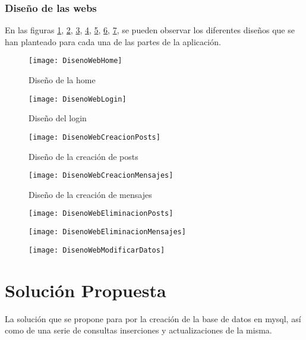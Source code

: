 \documentclass[a4paper]{article}
\begin{document}
	\subsubsection{Diseño de las webs}
	En las figuras \ref{home}, \ref{login}, \ref{post}, \ref{mensaje}, \ref{borrarPost}, \ref{borrarMensaje}, \ref{modificarDatos}, se pueden observar los diferentes diseños que se han planteado para cada una de las partes de la aplicación.
	\begin{figure}[htb]
		\texttt{[image: DisenoWebHome]}
		\caption{Diseño de la home}
		\label{home}
	\end{figure}
	\begin{figure}[htb]
		\texttt{[image: DisenoWebLogin]}
		\caption{Diseño del login}
		\label{login}
	\end{figure}
	\begin{figure}[htb]
		\texttt{[image: DisenoWebCreacionPosts]}
		\caption{Diseño de la creación de posts}
		\label{post}
	\end{figure}
	\begin{figure}[htb]
		\texttt{[image: DisenoWebCreacionMensajes]}
		\caption{Diseño de la creación de mensajes}
		\label{mensaje}
	\end{figure}
	\begin{figure}[htb]
		\texttt{[image: DisenoWebEliminacionPosts]}
		\caption{}
		\label{borrarPost}
	\end{figure}
	\begin{figure}[htb]
		\texttt{[image: DisenoWebEliminacionMensajes]}
		\caption{}
		\label{borrarMensaje}
	\end{figure}
	\begin{figure}[htb]
		\texttt{[image: DisenoWebModificarDatos]}
		\caption{}
		\label{modificarDatos}
	\end{figure}
	
	\section{Solución Propuesta}\label{solucion}
	La solución que se propone para por la creación de la base de datos en mysql, así como de una serie de consultas inserciones y actualizaciones de la misma.
	
\end{document}
